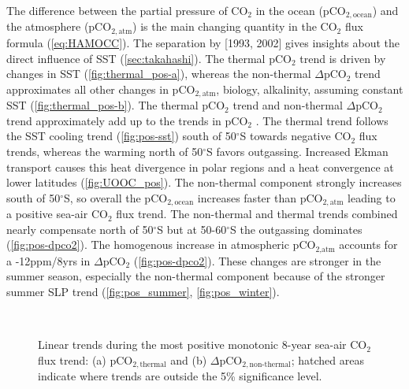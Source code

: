 The difference between the partial pressure of CO$_2$ in the ocean (pCO$_{2,\text{ocean}}$) and the atmosphere (pCO$_{2,\text{atm}}$) is the main changing quantity in the CO$_2$ flux formula \citep{Lovenduski2015} (\autoref{eq:HAMOCC}). The separation by \citeauthor{Takahashi1993} [{\color{RoyalBlue}1993}, {\color{RoyalBlue}2002}] gives insights about the direct influence of \ac{SST} (\autoref{sec:takahashi}). The thermal pCO$_2$ trend is driven by changes in \acs{SST} (\autoref{fig:thermal_pos-a}), whereas the non-thermal $\Delta $pCO$_2$ trend approximates all other changes in pCO$_{2,\text{atm}}$, biology, alkalinity, assuming constant \acs{SST} (\autoref{fig:thermal_pos-b}). The thermal pCO$_2$ trend and non-thermal $\Delta$pCO$_2$ trend approximately add up to the trends in pCO$_2$ \citep{landschuetzer2015}. 
The thermal trend follows the \acs{SST} cooling trend (\autoref{fig:pos-sst}) south of 50$^\circ$S towards negative CO$_2$ flux trends, whereas the warming north of 50$^\circ$S favors outgassing. Increased Ekman transport causes this heat divergence in polar regions and a heat convergence at lower latitudes \citep{Hall2002} (\autoref{fig:UOOC_pos}). The non-thermal component strongly increases south of 50$^\circ$S, so overall the pCO$_{2,\text{ocean}}$ increases faster than pCO$_{2,\text{atm}}$ leading to a positive sea-air CO$_2$ flux trend. %
The non-thermal and thermal trends combined nearly compensate north of 50$^\circ$S but at 50-60$^\circ$S the outgassing dominates (\autoref{fig:pos-dpco2}). The homogenous increase in atmospheric pCO$_{\text{2,atm}}$ accounts for a -12ppm/8yrs in $\Delta$pCO$_2$ (\autoref{fig:pos-dpco2}). %
These changes are stronger in the summer season, especially the non-thermal component because of the stronger summer \acs{SLP} trend (\autoref{fig:pos_summer}, \ref{fig:pos_winter}). 

\begin{figure}[bth]
        \myfloatalign
         \\
        \caption{Linear trends during the most positive monotonic 8-year sea-air CO$_2$ flux trend: (a) pCO$_{2,\text{thermal}}$ and (b) $\Delta$pCO$_{2,\text{non-thermal}}$; hatched areas indicate where trends are outside the 5\% significance level.} \label{fig:thermal_pos}
\end{figure}


